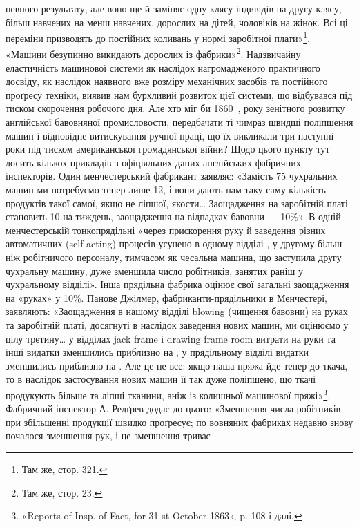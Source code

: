 певного результату, але воно ще й заміняє одну клясу індивідів
на другу клясу, більш навчених на менш навчених, дорослих
на дітей, чоловіків на жінок. Всі ці переміни призводять до постійних
коливань у нормі заробітної плати»\footnote{
Там же, стор. 321.
}. «Машини безупинно
викидають дорослих із фабрики»\footnote{
Там же, стор. 23.
}. Надзвичайну еластичність машинової системи як наслідок нагромадженого
практичного досвіду, як наслідок наявного вже розміру механічних
засобів та постійного проґресу техніки, виявив нам бурхливий
розвиток цієї системи, що відбувався під тиском скорочення
робочого дня. Але хто міг би 1860~, року зенітного розвитку
англійської бавовняної промисловости, передбачати ті чимраз
швидші поліпшення машин і відповідне витискування ручної
праці, що їх викликали три наступні роки під тиском американської
громадянської війни? Щодо цього пункту тут досить кількох
прикладів з офіціяльних даних англійських фабричних інспекторів.
Один менчестерський фабрикант заявляє: «Замість 75 чухральних
машин ми потребуємо тепер лише 12, і вони дають нам
таку саму кількість продуктів такої самої, якщо не ліпшої,
якости\dots{} Заощадження на заробітній платі становить 10 на тиждень, заощадження на відпадках бавовни — 10\%».
В одній менчестерській тонкопрядільні «через прискорення руху
й заведення різних автоматичних (self-acting) процесів усунено
в одному відділі , у другому більш ніж  робітничого
персоналу, тимчасом як чесальна машина, що заступила другу чухральну
машину, дуже зменшила число робітників, занятих раніш у чухральному
відділі». Інша прядільна фабрика оцінює свої загальні заощадження
на «руках» у 10\%. Панове Джілмер, фабриканти-прядільники
в Менчестері, заявляють: «Заощадження в нашому відділі
blowing (чищення бавовни) на руках та заробітній платі, досягнуті
в наслідок заведення нових машин, ми оцінюємо у цілу третину\dots{}
у відділах jack frame і drawing frame room витрати на руки та інші
видатки зменшились приблизно на , у прядільному відділі видатки
зменшились приблизно на . Але це не все: якщо наша пряжа
йде тепер до ткача, то в наслідок застосування нових машин її
так дуже поліпшено, що ткачі продукують більше та ліпші тканини,
аніж із колишньої машинової пряжі»\footnote{
«Reports of Insp. of Fact, for 31 st October 1863», p. 108 і далі.
}. Фабричний інспектор
А. Редґрев додає до цього: «Зменшення числа робітників
при збільшенні продукції швидко проґресує; по вовняних фабриках
недавно знову почалося зменшення рук, і це зменшення триває

